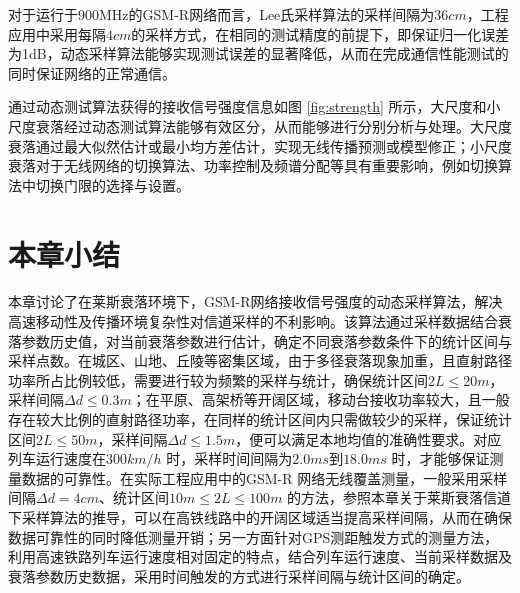 \begin{figure}[!htp]
\centering
\hspace{1in}
\centering
\end{figure}

对于运行于900MHz的GSM-R网络而言，Lee氏采样算法的采样间隔为$36cm$，工程应用中采用每隔$4cm$的采样方式，在相同的测试精度的前提下，即保证归一化误差为1dB，动态采样算法能够实现测试误差的显著降低，从而在完成通信性能测试的同时保证网络的正常通信。

通过动态测试算法获得的接收信号强度信息如图 \ref{fig:strength} 所示，大尺度和小尺度衰落经过动态测试算法能够有效区分，从而能够进行分别分析与处理。大尺度衰落通过最大似然估计或最小均方差估计，实现无线传播预测或模型修正；小尺度衰落对于无线网络的切换算法、功率控制及频谱分配等具有重要影响，例如切换算法中切换门限的选择与设置。

\section{本章小结}
\label{sec:conclusion2}

本章讨论了在莱斯衰落环境下，GSM-R网络接收信号强度的动态采样算法，解决高速移动性及传播环境复杂性对信道采样的不利影响。该算法通过采样数据结合衰落参数历史值，对当前衰落参数进行估计，确定不同衰落参数条件下的统计区间与采样点数。在城区、山地、丘陵等密集区域，由于多径衰落现象加重，且直射路径功率所占比例较低，需要进行较为频繁的采样与统计，确保统计区间$2L \leq 20m$，采样间隔$\Delta d \leq 0.3m$；在平原、高架桥等开阔区域，移动台接收功率较大，且一般存在较大比例的直射路径功率，在同样的统计区间内只需做较少的采样，保证统计区间$2L \leq 50m$，采样间隔$\Delta d \leq 1.5m$，便可以满足本地均值的准确性要求。对应列车运行速度在$300km/h$ 时，采样时间间隔为$2.0ms$到$18.0ms$ 时，才能够保证测量数据的可靠性。在实际工程应用中的GSM-R 网络无线覆盖测量，一般采用采样间隔$\Delta d = 4cm$、统计区间$10m \leq 2L \leq 100m$ 的方法，参照本章关于莱斯衰落信道下采样算法的推导，可以在高铁线路中的开阔区域适当提高采样间隔，从而在确保数据可靠性的同时降低测量开销；另一方面针对GPS测距触发方式的测量方法，利用高速铁路列车运行速度相对固定的特点，结合列车运行速度、当前采样数据及衰落参数历史数据，采用时间触发的方式进行采样间隔与统计区间的确定。

\nocite{Akhoondzadeh2007modifi,andersen1995propagation,bjornson2010framework,gopal2009power,itoh2002performance}
\nocite{sijbers1998maximum,zhang1996analysis,zhu2005performance,mousa2010estimation}
\nocite{saleh1987statistical}
\nocite{goldsmith1994error}
\nocite{aja2008restoration}
\nocite{saleh1987statistical}
\nocite{sijbers1998maximum}\nocite{devore2000atr}\nocite{mousa2010estimation}
